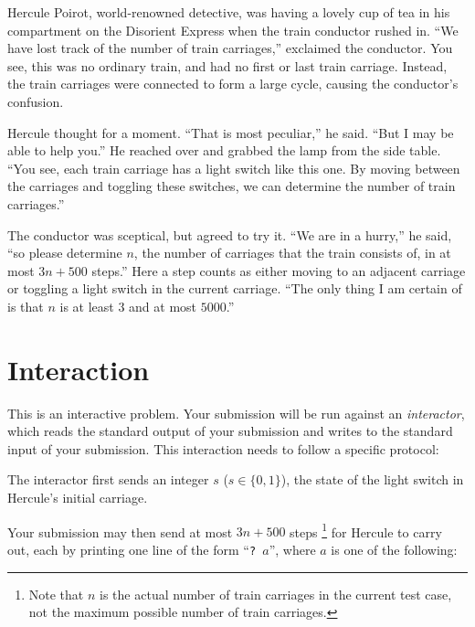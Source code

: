 
\newcommand{\maxn}{5000}
\newcommand{\maxq}{3n+500}

%
Hercule Poirot, world-renowned detective, was having a lovely cup of tea in his
compartment on the Disorient Express when the train conductor rushed in.
``We have lost track of the number of train carriages,'' exclaimed the conductor.
You see, this was no ordinary train, and had no first or last train carriage.
Instead, the train \mbox{carriages} %
were connected to form a large cycle, causing the
conductor's confusion.

Hercule thought for a moment. ``That is most peculiar,'' he said. ``But I may
be able to help you.'' He reached over and grabbed the lamp from the side
table. ``You see, each train carriage has a light switch like this one. By
moving between the carriages and toggling these switches, we can determine the
number of train carriages.''

The conductor was sceptical, but agreed to try it. ``We are in a hurry,'' he
said, ``so please determine $n$, the number of carriages that the train
consists of, in at most $\maxq$ steps.''
Here a step counts as either moving
to an adjacent carriage or toggling a light switch in the current carriage.
``The only thing I am certain of is that $n$ is at least $3$ and at most
$\maxn$.''

\vspace{-0.5em}

\section*{Interaction}
This is an interactive problem. Your submission will be run against an
\textit{interactor}, which reads the standard output of your submission and
writes to the standard input of your submission. This interaction needs to
follow a specific protocol:

The interactor first sends an integer $s$ ($s \in \{0,1\}$), the state of the
light switch in Hercule's initial carriage.

Your submission may then send at most $\maxq$ steps%
\footnote{Note that $n$ is the actual number of train carriages in the current
test case, not the maximum possible number of train carriages.}
for Hercule to carry out,
each by printing one line of the form ``\texttt{?~}$a$'', where $a$ is one of the following:

